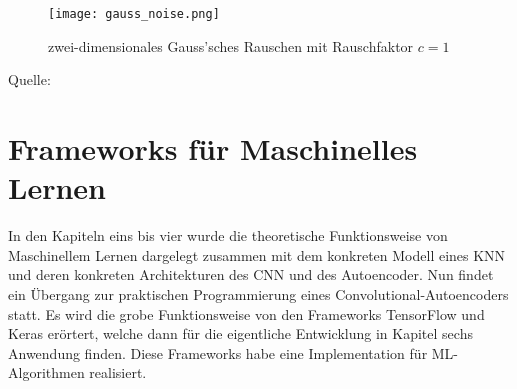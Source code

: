 \begin{figure}[h!]
  \centering
  \texttt{[image: gauss\_noise.png]}
  \caption{zwei-dimensionales Gauss'sches Rauschen mit Rauschfaktor $c=1$}
\end{figure}
\para{}
Quelle: \cite{wiki:gauss_noise}


\chapter{Frameworks für Maschinelles Lernen}
In den Kapiteln eins bis vier wurde die theoretische Funktionsweise von
Maschinellem Lernen dargelegt zusammen mit dem konkreten Modell eines KNN und deren
konkreten Architekturen des CNN und des Autoencoder.
Nun findet ein Übergang zur praktischen Programmierung eines
Convolutional-Autoencoders statt. Es wird die grobe Funktionsweise von den
Frameworks TensorFlow und Keras erörtert, welche dann
für die eigentliche Entwicklung in Kapitel sechs Anwendung finden.
Diese Frameworks habe eine Implementation für ML-Algorithmen realisiert.
\para{}
\bigskip

